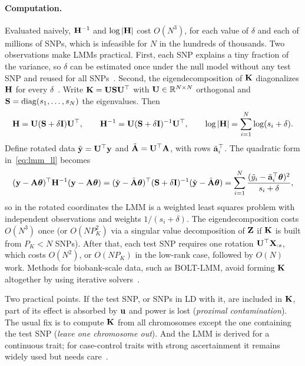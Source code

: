 \paragraph{Computation.} Evaluated naively, $\mathbf{H}^{-1}$ and $\log|\mathbf{H}|$ cost $O(N^3)$, for each value of $\delta$ and each of millions of SNPs, which is infeasible for $N$ in the hundreds of thousands. Two observations make LMMs practical. First, each SNP explains a tiny fraction of the variance, so $\delta$ can be estimated once under the null model without any test SNP and reused for all SNPs~\citep{kang2010}. Second, the eigendecomposition of $\mathbf{K}$ diagonalizes $\mathbf{H}$ for every $\delta$~\citep{lippert2011}. Write $\mathbf{K}=\mathbf{U}\mathbf{S}\mathbf{U}^\top$ with $\mathbf{U}\in\mathbb{R}^{N\times N}$ orthogonal and $\mathbf{S}=\operatorname{diag}(s_1,\dots,s_N)$ the eigenvalues. Then
\begin{equation}
  \mathbf{H} = \mathbf{U}(\mathbf{S}+\delta\mathbf{I})\mathbf{U}^\top,\qquad \mathbf{H}^{-1}=\mathbf{U}(\mathbf{S}+\delta\mathbf{I})^{-1}\mathbf{U}^\top,\qquad \log|\mathbf{H}|=\sum_{i=1}^N\log(s_i+\delta).
\end{equation}
Define rotated data $\tilde{\mathbf{y}}=\mathbf{U}^\top\mathbf{y}$ and $\tilde{\mathbf{A}}=\mathbf{U}^\top\mathbf{A}$, with rows $\tilde{\mathbf{a}}_i^\top$. The quadratic form in~\eqref{eq:lmm_ll} becomes
\begin{equation}
  (\mathbf{y}-\mathbf{A}\boldsymbol{\theta})^\top\mathbf{H}^{-1}(\mathbf{y}-\mathbf{A}\boldsymbol{\theta}) = (\tilde{\mathbf{y}}-\tilde{\mathbf{A}}\boldsymbol{\theta})^\top(\mathbf{S}+\delta\mathbf{I})^{-1}(\tilde{\mathbf{y}}-\tilde{\mathbf{A}}\boldsymbol{\theta}) = \sum_{i=1}^N\frac{(\tilde y_i-\tilde{\mathbf{a}}_i^\top\boldsymbol{\theta})^2}{s_i+\delta},
\end{equation}
so in the rotated coordinates the LMM is a weighted least squares problem with independent observations and weights $1/(s_i+\delta)$. The eigendecomposition costs $O(N^3)$ once (or $O(NP_K^2)$ via a singular value decomposition of $\mathbf{Z}$ if $\mathbf{K}$ is built from $P_K<N$ SNPs). After that, each test SNP requires one rotation $\mathbf{U}^\top\mathbf{X}_{:s}$, which costs $O(N^2)$, or $O(NP_K)$ in the low-rank case, followed by $O(N)$ work. Methods for biobank-scale data, such as BOLT-LMM, avoid forming $\mathbf{K}$ altogether by using iterative solvers~\citep{loh2015}.

Two practical points. If the test SNP, or SNPs in LD with it, are included in $\mathbf{K}$, part of its effect is absorbed by $\mathbf{u}$ and power is lost (\emph{proximal contamination}). The usual fix is to compute $\mathbf{K}$ from all chromosomes except the one containing the test SNP (\emph{leave one chromosome out}). And the LMM is derived for a continuous trait; for case-control traits with strong ascertainment it remains widely used but needs care~\citep{yang2014}.

